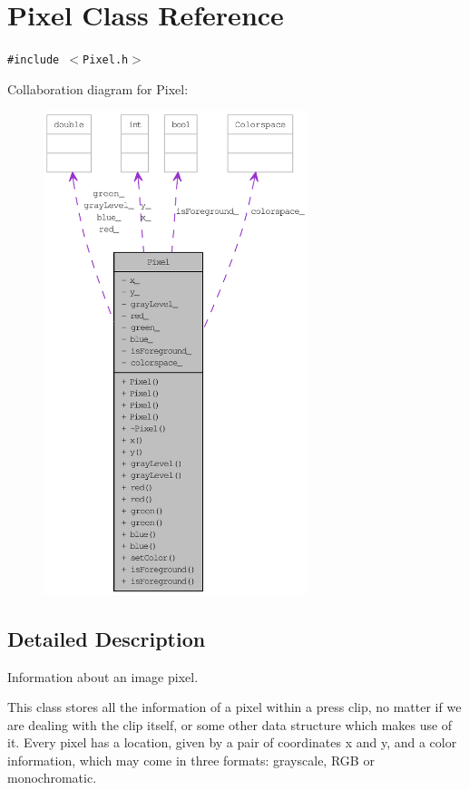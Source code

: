 \hypertarget{class_pixel}{
\section{Pixel Class Reference}
\label{class_pixel}
}
{\tt \#include $<$Pixel.h$>$}

Collaboration diagram for Pixel:\nopagebreak
\begin{figure}[H]
\begin{center}
\leavevmode
\includegraphics[height=400pt]{class_pixel__coll__graph}
\end{center}
\end{figure}


\subsection{Detailed Description}
Information about an image pixel. 

This class stores all the information of a pixel within a press clip, no matter if we are dealing with the clip itself, or some other data structure which makes use of it. Every pixel has a location, given by a pair of coordinates x and y, and a color information, which may come in three formats: grayscale, RGB or monochromatic.


